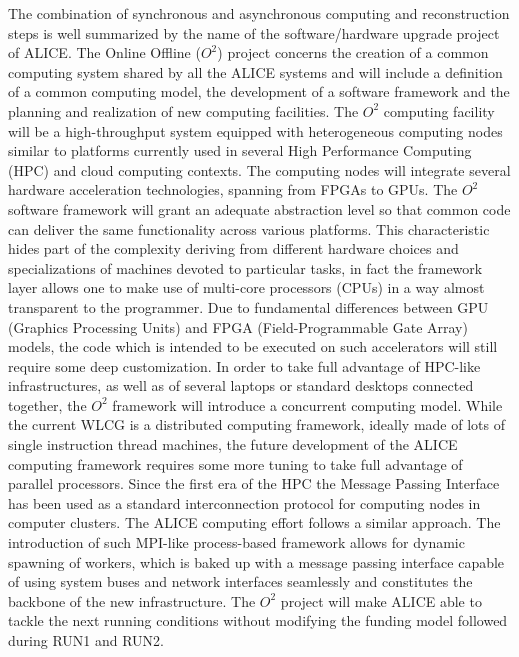 The combination of synchronous and asynchronous computing and reconstruction steps is well summarized by the name of the software/hardware upgrade project of ALICE.
The Online Offline ($O^2$) project concerns the creation of a common computing system shared by all the ALICE systems and will include a definition of a common computing model, the development of a software framework and the planning and realization of new computing facilities.
The $O^2$ computing facility will be a high-throughput system equipped with heterogeneous computing nodes similar to platforms currently used in several High Performance Computing (HPC) and cloud computing contexts.
The computing nodes will integrate several hardware acceleration technologies, spanning from FPGAs to GPUs.
The $O^2$ software framework will grant an adequate abstraction level so that common code can deliver the same functionality across various platforms.
This characteristic hides part of the complexity deriving from different hardware choices and specializations of machines devoted to particular tasks, in fact the framework layer allows one to make use of multi-core processors (CPUs) in a way almost transparent to the programmer.
Due to fundamental differences between GPU (Graphics Processing Units) and FPGA (Field-Programmable Gate Array) models, the code which is intended to be executed on such accelerators will still require some deep customization.
In order to take full advantage of HPC-like infrastructures, as well as of several laptops or standard desktops connected together, the $O^2$ framework will introduce a concurrent computing model.
While the current WLCG is a distributed computing framework, ideally made of lots of single instruction thread machines, the future development of the ALICE computing framework requires some more tuning to take full advantage of parallel processors.
Since the first era of the HPC the Message Passing Interface has been used as a standard interconnection protocol for computing nodes in computer clusters.
The ALICE computing effort follows a similar approach.
The introduction of such MPI-like process-based framework allows for dynamic spawning of workers, which is baked up with a message passing interface capable of using system buses and network interfaces seamlessly and constitutes the backbone of the new infrastructure.
The $O^2$ project will make ALICE able to tackle the next running conditions without modifying the funding model followed during RUN1 and RUN2.

